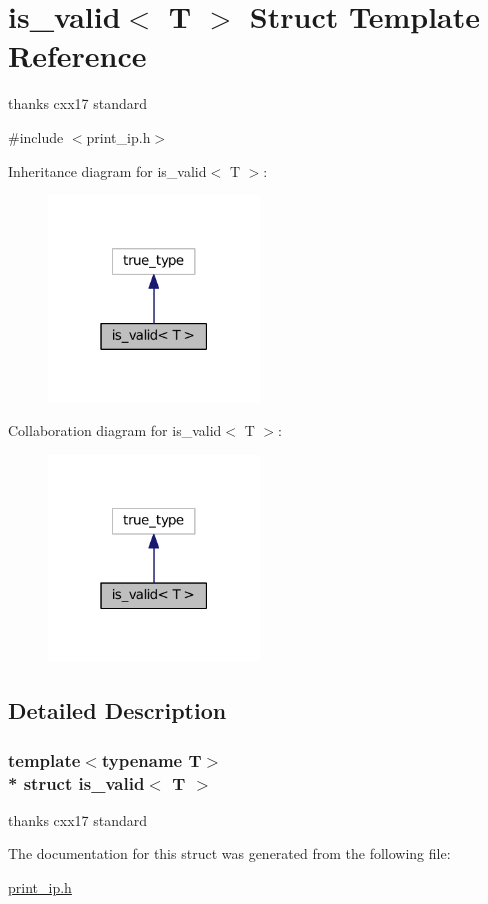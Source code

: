 \hypertarget{structis__valid_3_01T_01_4}{}\section{is\+\_\+valid$<$ T $>$ Struct Template Reference}
\label{structis__valid_3_01T_01_4}


thank\textquotesingle{}s cxx17 standard  




{\ttfamily \#include $<$print\+\_\+ip.\+h$>$}



Inheritance diagram for is\+\_\+valid$<$ T $>$\+:
\nopagebreak
\begin{figure}[H]
\begin{center}
\leavevmode
\includegraphics[width=159pt]{structis__valid_3_01T_01_4__inherit__graph}
\end{center}
\end{figure}


Collaboration diagram for is\+\_\+valid$<$ T $>$\+:
\nopagebreak
\begin{figure}[H]
\begin{center}
\leavevmode
\includegraphics[width=159pt]{structis__valid_3_01T_01_4__coll__graph}
\end{center}
\end{figure}


\subsection{Detailed Description}
\subsubsection*{template$<$typename T$>$\\*
struct is\+\_\+valid$<$ T $>$}

thank\textquotesingle{}s cxx17 standard 

The documentation for this struct was generated from the following file\+:\begin{DoxyCompactItemize}
\item 
\hyperlink{print__ip_8h}{print\+\_\+ip.\+h}\end{DoxyCompactItemize}
